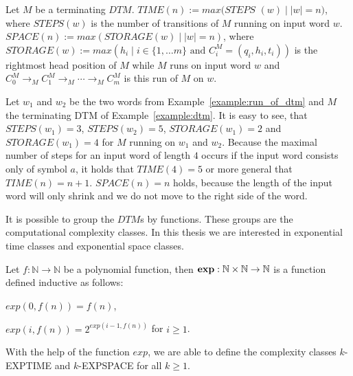 \begin{definition}
    Let $M$ be a terminating $\mathit{DTM}$. $\mathit{TIME}(n):= max(\mathit{STEPS}$ $(w)\mid |w| = n)$, where
    $\mathit{STEPS}(w)$ is the number of transitions of $M$ running on input word $w$. $\mathit{SPACE}(n) := max
    (\mathit{STORAGE}(w)\mid |w| = n)$, where $\mathit{STORAGE}(w) := max(h_i\mid i\in\{1, \dots m\} \text{ and }
    C_i^M = (q_i, h_i, t_i))$ is the rightmost head position of $M$ while $M$ runs on input word $w$ and $C_0^M
    \rightarrow_M
    C_1^M \rightarrow_M \dotsb \rightarrow_M C_m^M$ is this run of $M$ on $w$.
\end{definition}

\begin{example}
    \label{example:time_and_space}
    Let $w_1$ and $w_2$ be the two words from Example~\ref{example:run_of_dtm} and $M$ the terminating DTM of Example~\ref{example:dtm}. It is easy to see, that $\mathit{STEPS}
    (w_1) = 3$, $\mathit{STEPS}(w_2) = 5$, $\mathit{STORAGE}(w_1) = 2$ and $\mathit{STORAGE}(w_1) = 4$ for $M$ running on $w_1$ and $w_2$. Because the maximal number of steps for an input word of length $4$ occurs if the input word consists only of symbol
    $a$, it holds that $\mathit{TIME}(4) = 5$ or more general that $\mathit{TIME}(n) = n + 1$. $\mathit{SPACE}(n) = n$
    holds, because the length of the input word will only shrink and we do not move to the right side of the word.
\end{example}

It is possible to group the $\mathit{DTM}$s by functions. These groups are the computational complexity classes.
In this thesis we are interested in exponential time classes and exponential space classes.

\begin{definition}
    Let $f: \mathbb{N} \rightarrow \mathbb{N}$ be a polynomial function, then $\emph{exp}: \mathbb{N} \times \mathbb{N}
    \rightarrow \mathbb{N}$ is a function defined inductive as follows:
    \begin{compactitem}
        \item $exp(0, f(n)) = f(n)$,
        \item $exp(i, f(n)) = 2^{exp(i - 1, f(n))}$ for $i \geq 1$.
    \end{compactitem}
\end{definition}

With the help of the function $exp$, we are able to define the complexity classes $k$-EXPTIME and $k$-EXPSPACE for
all $k \geq 1$.

